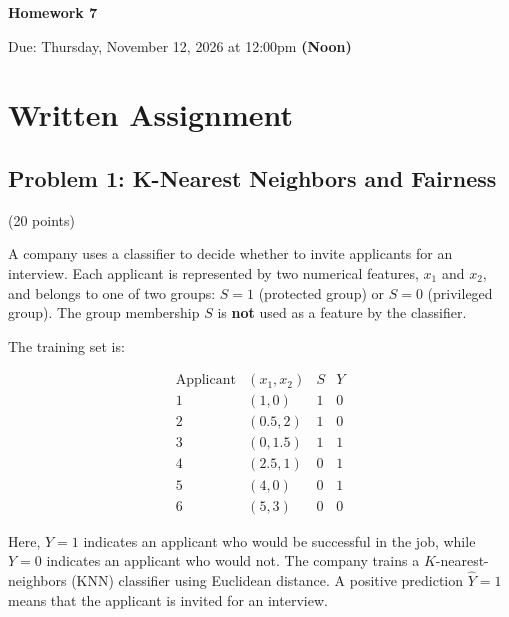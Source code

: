 \documentclass{article}
\newcommand\hwnumber{7}                      %
\newcommand\duedate{Thursday, November 12, 2026 at 12:00pm \textbf{(Noon)}}
\begin{document}
   \begin{center}
      \huge\textbf{Homework \hwnumber}
   \end{center}

   \begin{center}
        \large{Due: \duedate}
   \end{center}
\section*{\LARGE Written Assignment}
\subsection*{Problem 1: K-Nearest Neighbors and Fairness}
(20 points)

\bigskip
A company uses a classifier to decide whether to invite applicants
for an interview. Each applicant is represented by two numerical
features, $x_1$ and $x_2$, and belongs to one of two groups:
$S=1$ (protected group) or $S=0$ (privileged group).
The group membership $S$ is \textbf{not} used as a feature
by the classifier.

The training set is:

\[
\begin{array}{c|c|c|c}
\text{Applicant} & (x_1,x_2) & S & Y\\
\hline
1 & (1,0)   & 1 & 0\\
2 & (0.5,2) & 1 & 0\\
3 & (0,1.5) & 1 & 1\\
4 & (2.5,1) & 0 & 1\\
5 & (4,0)   & 0 & 1\\
6 & (5,3)   & 0 & 0
\end{array}
\]

Here, $Y=1$ indicates an applicant who would be successful
in the job, while $Y=0$ indicates an applicant who would not.
The company trains a $K$-nearest-neighbors (KNN) classifier
using Euclidean distance. A positive prediction $\hat{Y}=1$
means that the applicant is invited for an interview.
\end{document}
